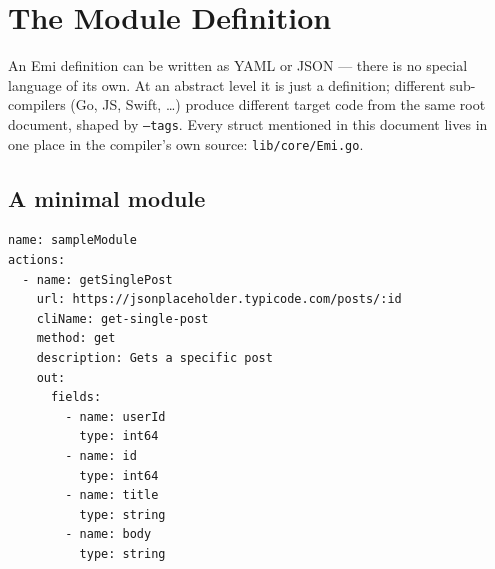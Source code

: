 \section{The Module Definition}
\label{sec:module-spec}

An Emi definition can be written as YAML or JSON --- there is no special
language of its own. At an abstract level it is just a definition;
different sub-compilers (Go, JS, Swift, \ldots) produce different target
code from the same root document, shaped by \texttt{--tags}. Every struct
mentioned in this document lives in one place in the compiler's own source:
\texttt{lib/core/Emi.go}.

\subsection{A minimal module}
\begin{lstlisting}
name: sampleModule
actions:
  - name: getSinglePost
    url: https://jsonplaceholder.typicode.com/posts/:id
    cliName: get-single-post
    method: get
    description: Gets a specific post
    out:
      fields:
        - name: userId
          type: int64
        - name: id
          type: int64
        - name: title
          type: string
        - name: body
          type: string
\end{lstlisting}


